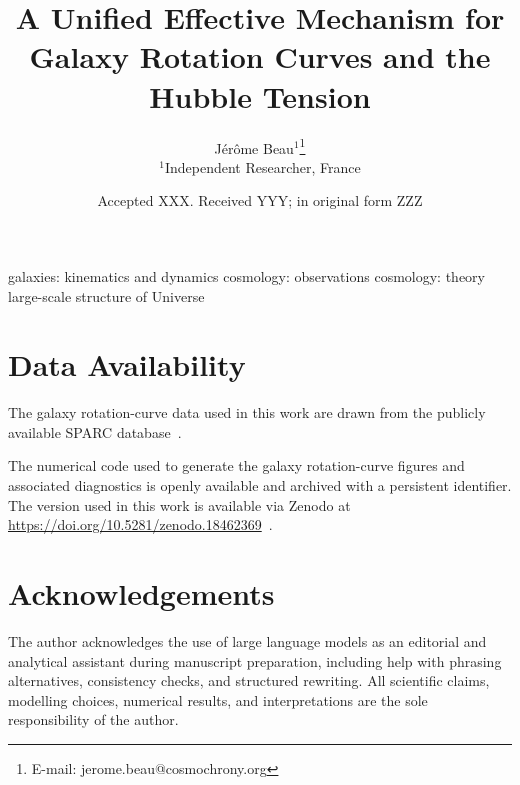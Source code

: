 \documentclass[fleqn,usenatbib]{mnras}
\title[Unified low-density phenomenology]
{A Unified Effective Mechanism for Galaxy Rotation Curves and the Hubble Tension}
\author[J.~Beau]{
  J\'er\^ome Beau$^{1}$\thanks{E-mail: jerome.beau@cosmochrony.org}\\
  $^{1}$Independent Researcher, France
}
\date{Accepted XXX. Received YYY; in original form ZZZ}
\begin{document}
  \label{firstpage}
  \pagerange{\pageref{firstpage}\textendash{}\pageref{lastpage}}
  \maketitle

  \begin{abstract}
    
  \end{abstract}

  \begin{keywords}
    galaxies: kinematics and dynamics \textendash{}
    cosmology: observations \textendash{}
    cosmology: theory \textendash{}
    large-scale structure of Universe
  \end{keywords}

  
  
  
  
  
  
  

  \section*{Data Availability}

    The galaxy rotation-curve data used in this work are drawn from the publicly available
    SPARC database~\cite{Lelli2016SPARC}.

    The numerical code used to generate the galaxy rotation-curve figures and associated
    diagnostics is openly available and archived with a persistent identifier.
    The version used in this work is available via Zenodo at
    \url{https://doi.org/10.5281/zenodo.18462369}~\cite{CosmochronySimulation}.

  \section*{Acknowledgements}

    The author acknowledges the use of large language models as an editorial and analytical assistant during manuscript
    preparation, including help with phrasing alternatives, consistency checks, and structured rewriting.
    All scientific claims, modelling choices, numerical results, and interpretations are the sole responsibility of the
    author.


    
    

    \label{lastpage}
\end{document}
